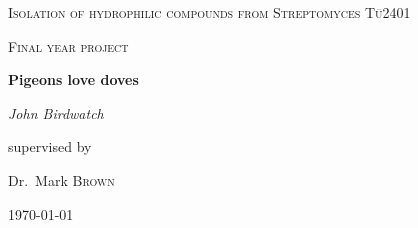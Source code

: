 \documentclass{scrreprt}
\begin{document}

\begin{titlepage}
	\centering
	{\scshape\Huge Isolation of hydrophilic compounds from Streptomyces T\"u2401 \par}
	\vspace{1cm}
	{\scshape\Large Final year project\par}
	\vspace{1.5cm}
	{\huge\bfseries Pigeons love doves\par}
	\vspace{2cm}
	{\Large\itshape John Birdwatch\par}
	\vfill
	supervised by\par
	Dr.~Mark \textsc{Brown}

	\vfill

	{\large \today\par}
\end{titlepage}
\end{document}
